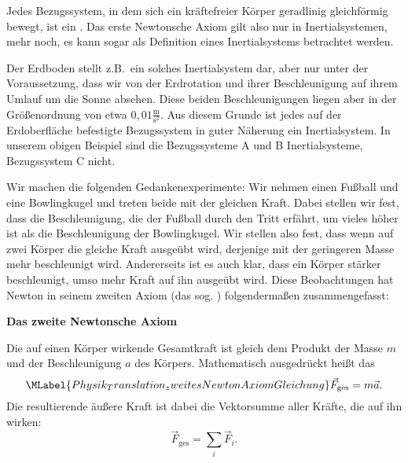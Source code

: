 \begin{MContent}
               
                             
               
               \begin{MInfo}
               Jedes Bezugssystem, in dem sich ein kr\"aftefreier K\"orper geradlinig gleichf\"ormig bewegt, ist ein . Das erste Newtonsche Axiom gilt also nur in Inertialsystemen, mehr noch, es kann sogar als Definition eines Inertialsystems betrachtet werden.
               \end{MInfo}
               
               Der Erdboden stellt z.B.~ein solches Inertialsystem dar, aber nur unter der Voraussetzung, dass wir von der Erdrotation und ihrer Beschleunigung auf ihrem Umlauf um die Sonne absehen. Diese beiden Beschleunigungen liegen aber in der Gr\"o{\ss}enordnung von etwa ${0,01}\frac{\text{m}}{\text{s}^2}$. Aus diesem Grunde ist jedes auf der Erdoberfl\"ache befestigte Bezugssystem in guter N\"aherung ein Inertialsystem. In unserem obigen Beispiel sind die Bezugssysteme A und B Inertialsysteme, Bezugssystem C nicht.
              
               
               
               
               Wir machen die folgenden Gedankenexperimente: Wir nehmen einen Fu{\ss}ball und eine Bowlingkugel und treten beide mit der gleichen Kraft. Dabei stellen wir fest, dass die Beschleunigung, die der Fu{\ss}ball durch den Tritt erf\"ahrt, um vieles h\"oher ist als die Beschleunigung der Bowlingkugel. Wir stellen also fest, dass wenn auf zwei K\"orper die gleiche Kraft ausge\"ubt wird, derjenige mit der geringeren Masse mehr beschleunigt wird. Andererseits ist es auch klar, dass ein K\"orper st\"arker beschleunigt, umso mehr Kraft auf ihn ausge\"ubt wird. Diese Beobachtungen hat Newton in seinem zweiten Axiom (das sog. ) folgenderma{\ss}en zusammengefasst:
               
               \begin{MInfo} 
              \textbf{Das zweite Newtonsche Axiom}
               
               
               Die auf einen K\"orper wirkende Gesamtkraft ist gleich dem Produkt der Masse $m$ und der Beschleunigung $a$ des K\"orpers. Mathematisch ausgedr\"uckt hei{\ss}t das
               \begin{equation}\MLabel{Physik_Translation_zweitesNewtonAxiomGleichung}
               \vec{F}_{\text{ges}}=m\vec{a}.
               \end{equation} Die resultierende \"au{\ss}ere Kraft ist dabei die Vektorsumme aller Kr\"afte, die auf ihn wirken:
               \begin{equation*}
               \vec{F}_{\text{ges}}=\sum_i \vec{F}_i.
               \end{equation*}
               \end{MInfo}
               

\end{MContent}
